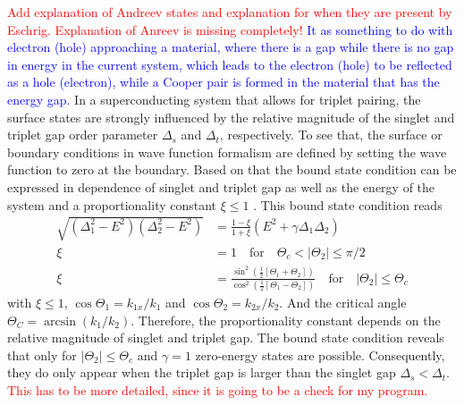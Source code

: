 \textcolor{red}{Add explanation of Andreev states and explanation for when they are present by Eschrig. \newline Explanation of Anreev is missing completely!}\newline
\textcolor{blue}{It as something to do with electron (hole) approaching a material, where there is a gap while there is no gap in energy in the current system, which leads to the electron (hole) to be reflected as a hole (electron), while a Cooper pair is formed in the material that has the energy gap. \cite{ghanbari_rkky_nodate}} \newline
In a superconducting system that allows for triplet pairing, the surface states are strongly influenced by the relative magnitude of the singlet and triplet gap order parameter $\Delta_s$ and $\Delta_t$, respectively.\newline
To see that, the surface or boundary conditions in wave function formalism are defined by setting the wave function to zero at the boundary.
Based on that the bound state condition can be expressed in dependence of singlet and triplet gap as well as the energy of the system and a proportionality constant $\xi \leq 1$ \cite{eschrig2010theoretical}.
This bound state condition reads
\begin{align}\nonumber
    \sqrt{(\Delta_1^2-E^2)(\Delta_2^2-E^2)} &= \frac{1-\xi}{1+\xi}(E^2+\gamma\Delta_1\Delta_2) \\ \nonumber
    \xi &= 1 \quad \text{for} \quad \Theta_c < |\Theta_2| \leq \pi/2 \\ \nonumber
    \xi &= \frac{\sin^2(\frac{1}{2}[\Theta_1+\Theta_2])}{\cos^2(\frac{1}{2}[\Theta_1-\Theta_2])} \quad \text{for} \quad |\Theta_2| \leq \Theta_c
\end{align}
with $\xi \leq 1$, $\cos\Theta_1 = k_{1x}/k_1$ and $\cos\Theta_2 = k_{2x}/k_2$. And the critical angle $\Theta_C= \arcsin{(k_1/k_2)}$. \newline
Therefore, the proportionality constant depends on the relative magnitude of singlet and triplet gap. The bound state condition reveals that only for $|\Theta_2| \leq \Theta_c$ and $\gamma =1$ zero-energy states are possible. Consequently, they do only appear when the triplet gap is larger than the singlet gap $\Delta_s < \Delta_t$.
\textcolor{red}{This has to be more detailed, since it is going to be a check for my program.}